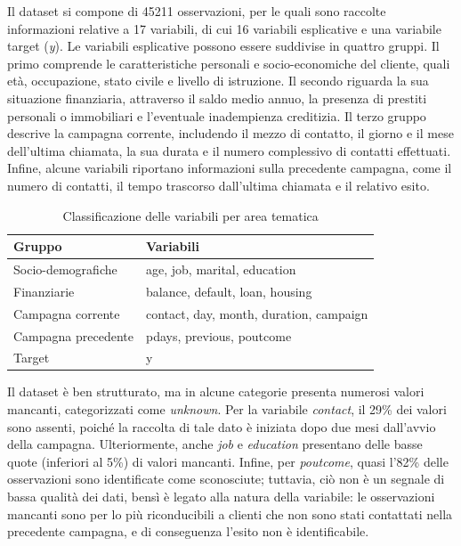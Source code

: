 \documentclass[11,5pt, a4paper]{article}
\begin{document}
Il dataset si compone di 45211 osservazioni, per le quali sono raccolte informazioni relative a 17 variabili, di cui 16 variabili esplicative e una variabile target (\textit{y}). 
Le variabili esplicative possono essere suddivise in quattro gruppi. Il primo comprende le caratteristiche personali e socio-economiche del cliente, quali età, occupazione, stato civile e livello di istruzione. Il secondo riguarda la sua situazione finanziaria, attraverso il saldo medio annuo, la presenza di prestiti personali o immobiliari e l'eventuale inadempienza creditizia. Il terzo gruppo descrive la campagna corrente, includendo il mezzo di contatto, il giorno e il mese dell'ultima chiamata, la sua durata e il numero complessivo di contatti effettuati. Infine, alcune variabili riportano informazioni sulla precedente campagna, come il numero di contatti, il tempo trascorso dall'ultima chiamata e il relativo esito.



\begin{table}[h]
\centering
\caption{Classificazione delle variabili per area tematica}
\begin{tabular}{@{}ll@{}}
\toprule
\textbf{Gruppo} & \textbf{Variabili} \\ \midrule
Socio-demografiche & age, job, marital, education \\
Finanziarie & balance, default, loan, housing \\
Campagna corrente & contact, day, month, duration, campaign \\
Campagna precedente & pdays, previous, poutcome \\
Target & y \\ \bottomrule
\end{tabular}
\end{table}

Il dataset è ben strutturato, ma in alcune categorie presenta numerosi valori mancanti, categorizzati come \textit{unknown}. Per la variabile \textit{contact}, il 29\% dei valori sono assenti, poiché la raccolta di tale dato è iniziata dopo due mesi dall'avvio della campagna. Ulteriormente, anche \textit{job} e \textit{education} presentano delle basse quote (inferiori al 5\%) di valori mancanti. Infine, per \textit{poutcome}, quasi l'82\% delle osservazioni sono identificate come sconosciute; tuttavia, ciò non è un segnale di bassa qualità dei dati, bensì è legato alla natura della variabile: le osservazioni mancanti sono per lo più riconducibili a clienti che non sono stati contattati nella precedente campagna, e di conseguenza l'esito non è identificabile.
\end{document}
